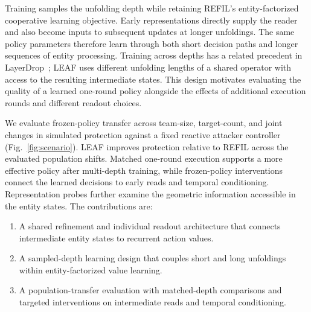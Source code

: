 Training samples the unfolding depth while retaining REFIL's entity-factorized cooperative learning objective. Early representations directly supply the reader and also become inputs to subsequent updates at longer unfoldings. The same policy parameters therefore learn through both short decision paths and longer sequences of entity processing. Training across depths has a related precedent in LayerDrop~\cite{fan2020layerdrop}; LEAF uses different unfolding lengths of a shared operator with access to the resulting intermediate states. This design motivates evaluating the quality of a learned one-round policy alongside the effects of additional execution rounds and different readout choices.

We evaluate frozen-policy transfer across team-size, target-count, and joint changes in simulated protection against a fixed reactive attacker controller (Fig.~\ref{fig:scenario}). LEAF improves protection relative to REFIL across the evaluated population shifts. Matched one-round execution supports a more effective policy after multi-depth training, while frozen-policy interventions connect the learned decisions to early reads and temporal conditioning. Representation probes further examine the geometric information accessible in the entity states. The contributions are:
\begin{enumerate}
\item A shared refinement and individual readout architecture that connects intermediate entity states to recurrent action values.
\item A sampled-depth learning design that couples short and long unfoldings within entity-factorized value learning.
\item A population-transfer evaluation with matched-depth comparisons and targeted interventions on intermediate reads and temporal conditioning.
\end{enumerate}
